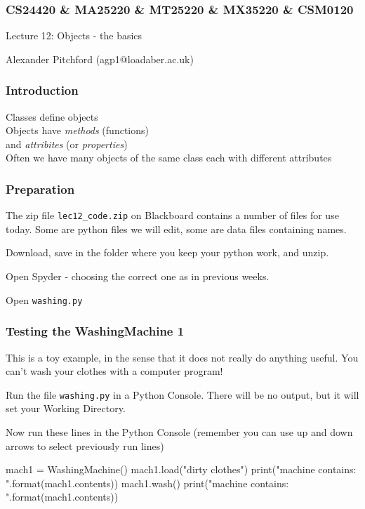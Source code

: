 \documentclass{beamer}
\begin{document}

\begin{frame}
\frametitle{CS24420 \& MA25220 \& MT25220 \& MX35220 \& CSM0120}

\begin{center}
\begin{huge}
Lecture 12: Objects - the basics 
\end{huge}
\bigskip

Alexander Pitchford (agp1@loadaber.ac.uk)

\end{center}
\end{frame}


\begin{frame}[fragile]
\frametitle{Introduction}
Classes define objects\\
Objects have \emph{methods} (functions)\\
and \emph{attribites} (or \emph{properties})\\
\bigskip
Often we have many objects of the same class each with different attributes  
\end{frame}

\begin{frame}[fragile]
\frametitle{Preparation}
The zip file \texttt{lec12\_code.zip} on Blackboard contains a number of files for
use today. Some are python files we will edit, some are data files containing names.

Download, save in the folder where you keep your python work, and unzip.

Open Spyder - choosing the correct one as in previous weeks.

Open \texttt{washing.py}



\end{frame}

\begin{frame}[fragile]
\frametitle{Testing the WashingMachine 1}
This is a toy example, in the sense that it does not really do anything useful.
You can't wash your clothes with a computer program!

Run the file \texttt{washing.py} in a Python Console. There will be no output, 
but it will set your Working Directory. 

Now run these lines in the Python Console
(remember you can use up and down arrows to select previously run lines)
\begin{code} 
mach1 = WashingMachine()
mach1.load("dirty clothes")
print("machine contains: {}".format(mach1.contents))
mach1.wash()
print("machine contains: {}".format(mach1.contents))
\end{code}

\end{frame}
\end{document}

